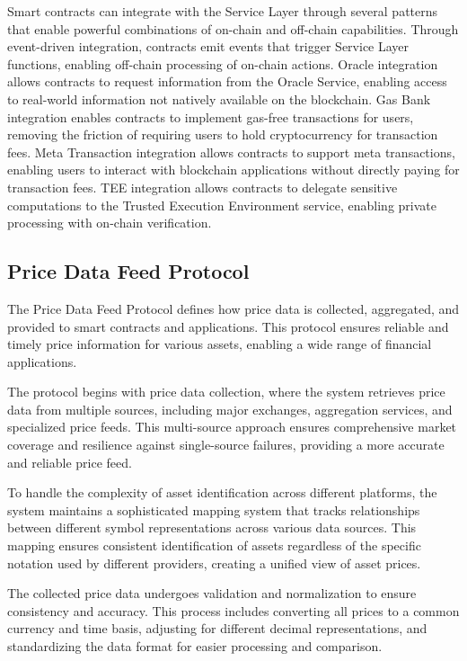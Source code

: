 \documentclass[12pt,a4paper]{article}
\begin{document}
Smart contracts can integrate with the Service Layer through several patterns that enable powerful combinations of on-chain and off-chain capabilities. Through event-driven integration, contracts emit events that trigger Service Layer functions, enabling off-chain processing of on-chain actions. Oracle integration allows contracts to request information from the Oracle Service, enabling access to real-world information not natively available on the blockchain. Gas Bank integration enables contracts to implement gas-free transactions for users, removing the friction of requiring users to hold cryptocurrency for transaction fees. Meta Transaction integration allows contracts to support meta transactions, enabling users to interact with blockchain applications without directly paying for transaction fees. TEE integration allows contracts to delegate sensitive computations to the Trusted Execution Environment service, enabling private processing with on-chain verification.

\subsection{Price Data Feed Protocol}
\label{subsec:price-feed-protocol-spec}

The Price Data Feed Protocol defines how price data is collected, aggregated, and provided to smart contracts and applications. This protocol ensures reliable and timely price information for various assets, enabling a wide range of financial applications.



The protocol begins with price data collection, where the system retrieves price data from multiple sources, including major exchanges, aggregation services, and specialized price feeds. This multi-source approach ensures comprehensive market coverage and resilience against single-source failures, providing a more accurate and reliable price feed.

To handle the complexity of asset identification across different platforms, the system maintains a sophisticated mapping system that tracks relationships between different symbol representations across various data sources. This mapping ensures consistent identification of assets regardless of the specific notation used by different providers, creating a unified view of asset prices.

The collected price data undergoes validation and normalization to ensure consistency and accuracy. This process includes converting all prices to a common currency and time basis, adjusting for different decimal representations, and standardizing the data format for easier processing and comparison.
\end{document}
